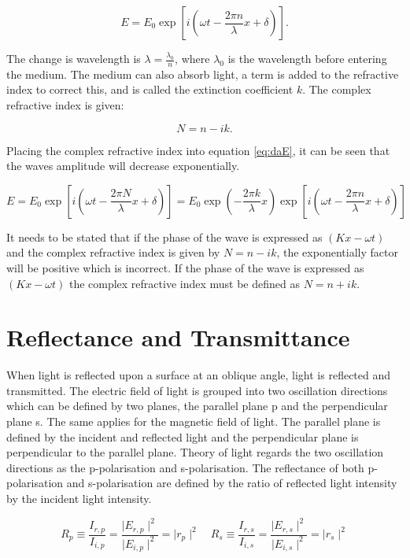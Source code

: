 \documentclass[MasterThesisMain.tex]{subfiles}
\begin{document}
\begin{equation}
E = E_0\exp[i(\omega t - \frac{2\pi n}{\lambda}x + \delta)]\label{eq:daE}.
\end{equation}

The change is wavelength is $\lambda = \frac{\lambda_0}{n}$, where $\lambda_0$ is the wavelength before entering the medium. The medium can also absorb light, a term is added to the refractive index to correct this, and is called the extinction coefficient $k$. The complex refractive index is given:

\begin{equation}
N=n-ik.
\end{equation}

Placing the complex refractive index into equation \ref{eq:daE}, it can be seen that the waves amplitude will decrease exponentially.

\begin{equation}
E = E_0\exp[i(\omega t - \frac{2\pi N}{\lambda}x + \delta)] = E_0\exp(-\frac{2\pi k}{\lambda}x)\exp[i(\omega t - \frac{2\pi n}{\lambda}x + \delta)]
\end{equation}

It needs to be stated that if the phase of the wave is expressed as $(Kx-\omega t)$ and the complex refractive index is given by $N=n-ik$, the exponentially factor will be positive which is incorrect. If the phase of the wave is expressed as $(Kx-\omega t)$ the complex refractive index must be defined as $N=n+ik$.

\section{Reflectance and Transmittance}\label{ch:reflect/trans}
When light is reflected upon a surface at an oblique angle, light is reflected and transmitted. The electric field of light is grouped into two oscillation directions which can be defined by two planes, the parallel plane p and the perpendicular plane s. The same applies for the magnetic field of light. The parallel plane is defined by the incident and reflected light and the perpendicular plane is perpendicular to the parallel plane. Theory of light regards the two oscillation directions as the p-polarisation and s-polarisation. The reflectance of both p-polarisation and s-polarisation are defined by the ratio of reflected light intensity by the incident light intensity.

\begin{equation}
R_{p} \equiv \frac{I_{r,p}}{I_{i,p}} = \frac{\mid E_{r,p} \mid^2}{\mid E_{i,p} \mid^2} = \mid r_{p} \mid^2 \quad R_{s} \equiv \frac{I_{r,s}}{I_{i,s}} = \frac{\mid E_{r,s} \mid^2}{\mid E_{i,s} \mid^2} = \mid r_{s} \mid^2
\end{equation}
\end{document}
